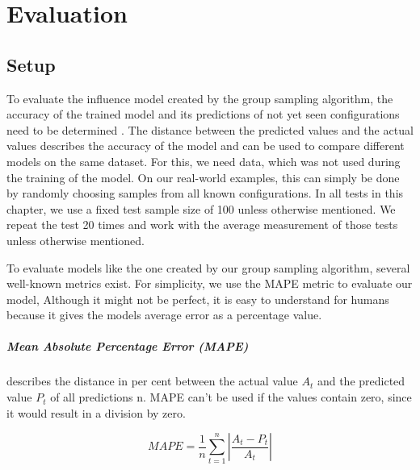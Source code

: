 \documentclass[../thesis.tex]{subfiles}
\begin{document}
\chapter{Evaluation}\label{chapter:eval}



\section{Setup}
To evaluate the influence model created by the group sampling algorithm,
the accuracy of the trained model and its predictions of not yet seen configurations
need to be determined \cite{domingos2012few}.
The distance between the predicted values and the actual values
describes the accuracy of the model and can be used to compare different models on the
same dataset. For this, we need data, which was not used during the training of the model.
On our real-world examples, this can simply be done by randomly choosing samples from
all known configurations. In all tests in this chapter, we use a fixed test sample
size of 100 unless otherwise mentioned.
We repeat the test 20 times and work with the average measurement of those tests unless otherwise mentioned.

To evaluate models like the one created by our group sampling algorithm, several
well-known metrics exist. For simplicity, we use the MAPE metric to evaluate our model,
Although it might not be perfect, it is easy to understand for humans because it gives the models average
error as a percentage value.

\paragraph{Mean Absolute Percentage Error (MAPE)} describes the distance in per cent between
the actual value $A_{t}$ and the predicted value $P_{t}$ of all predictions n. MAPE
can't be used if the values contain zero, since it would result in a division by zero.

\begin{equation}
      MAPE = \frac{1}{n} \sum_{t=1}^{n}\left| \frac{A_t-P_t}{A_t} \right|
\end{equation}


\end{document}
